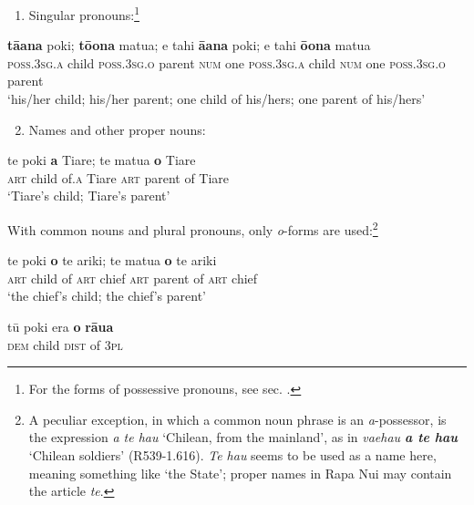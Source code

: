 \begin{enumerate}
\item 
Singular pronouns:\footnote{\label{fn:294}For the forms of possessive pronouns, see sec. .} 
\end{enumerate}

\ea\label{ex:6.54}
\gll
\textbf{tā{\ꞌ}ana} poki; \textbf{tō{\ꞌ}ona} matu{\ꞌ}a; e tahi \textbf{{\ꞌ}ā{\ꞌ}ana} poki; e tahi \textbf{ō{\ꞌ}ona} matu{\ꞌ}a\\
\textsc{poss.3sg.a} child \textsc{poss.3sg.o} parent \textsc{num} one \textsc{poss.3sg.a} child \textsc{num} one \textsc{poss.3sg.o} parent\\

\glt
‘his/her child; his/her parent; one child of his/hers; one parent of his/hers’ 
\z

\begin{enumerate}
\setcounter{enumi}{1}
\item 
Names and other proper nouns:
\end{enumerate}

\ea\label{ex:6.55}
\gll
te poki \textbf{{\ꞌ}a} Tiare; te matu{\ꞌ}a \textbf{o} Tiare\\
\textsc{art} child of\textsc{.a} Tiare \textsc{art} parent of Tiare\\

\glt
‘Tiare’s child; Tiare’s parent’  
\z

With common nouns and plural pronouns, only \textit{o}{}-forms are used:\footnote{\label{fn:295}A peculiar exception, in which a common noun phrase is an \textit{a}{}-possessor, is the expression \textit{{\ꞌ}a te hau} ‘Chilean, from the mainland’, as in \textit{va{\ꞌ}ehau \textbf{{\ꞌ}a te hau}} ‘Chilean soldiers’ (R539-1.616). \textit{Te hau} seems to be used as a name here, meaning something like ‘the State’; proper names in Rapa Nui may contain the article \textit{te}.}

\ea\label{ex:6.56}
\gll
te poki \textbf{o} te {\ꞌ}ariki; te matu{\ꞌ}a \textbf{o} te {\ꞌ}ariki\\
\textsc{art} child of \textsc{art} chief \textsc{art} parent of \textsc{art} chief\\

\glt 
‘the chief’s child; the chief’s parent’\textstyleExampleref{} 
\z

\ea\label{ex:6.57}
\gll
tū poki era \textbf{o} \textbf{rāua}\\
\textsc{dem} child \textsc{dist} of \textsc{3pl}\\

